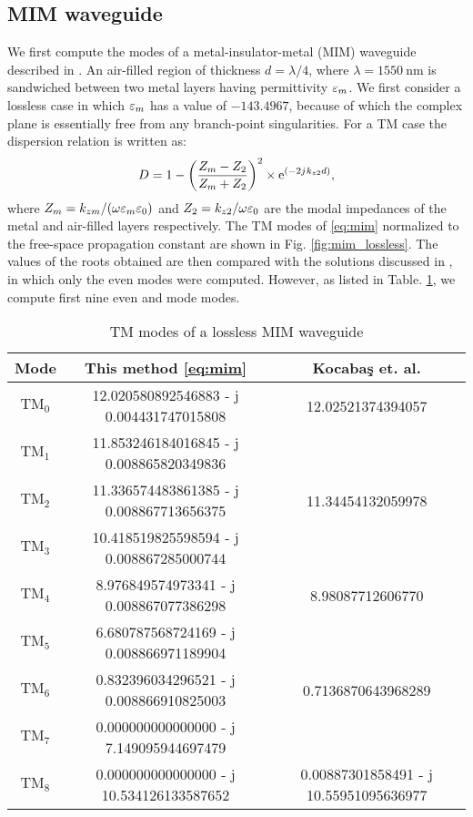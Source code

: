 \documentclass[12pt]{article}
\begin{document}
\subsection{MIM waveguide}
%
%
We first compute the modes of a metal-insulator-metal (MIM) waveguide described in \cite{Kocabas2009}. An air-filled region of thickness $d = \lambda/4$, where $\lambda = \SI{1550}{\nm}$ is sandwiched between two metal layers having permittivity $\varepsilon_m$. We first consider a lossless case in which $\varepsilon_m$ has a value of $-143.4967$, because of which the complex plane is essentially free from any branch-point singularities. For a TM case the dispersion relation is written as:
%
\begin{equation}
  D =  1 - \left(\frac{Z_m - Z_2}{Z_m + Z_2}\right)^2 \times \mathrm{e}^{(-2j\mkern1mu  k_{z2} d)},
  \label{eq:mim}
\end{equation}
%
where $Z_m = k_{zm}/(\omega \varepsilon_m \varepsilon_0)$ and $Z_2 = k_{z2}/{\omega \varepsilon_0}$ are the modal impedances of the metal and air-filled layers respectively. The TM modes of \eqref{eq:mim} normalized to the free-space propagation constant are shown in Fig. \ref{fig:mim_lossless}. The values of the roots obtained are then compared with the solutions discussed in \cite{Kocabas2009}, in which only the even modes were computed. However, as listed in Table. \ref{tab:kocabas_lossless}, we compute first nine even and mode modes.
%
\begin{table}[h!]
\begin{center}
 \begin{tabular}{||c |c |c||}
 \hline
 Mode & This method \eqref{eq:mim} & Kocaba{\c{s}} et. al. \cite{Kocabas2009} \\ [0.5ex]
 \hline\hline
 $\text{TM}_0$ & \num{12.020580892546883 - j 0.004431747015808} & \num{12.02521374394057} \\
 $\text{TM}_1$ & \num{11.853246184016845 - j 0.008865820349836} & \num{} \\
 $\text{TM}_2$ & \num{11.336574483861385 - j 0.008867713656375} & \num{11.34454132059978} \\
 $\text{TM}_3$ & \num{10.418519825598594 - j 0.008867285000744} & \num{} \\
 $\text{TM}_4$ & \num{8.976849574973341 - j 0.008867077386298} & \num{8.98087712606770} \\
 $\text{TM}_5$ & \num{6.680787568724169 - j 0.008866971189904} & \num{} \\
 $\text{TM}_6$ & \num{0.832396034296521 - j 0.008866910825003} & \num{0.7136870643968289} \\
 $\text{TM}_7$ & \num{0.000000000000000 - j 7.149095944697479} & \num{} \\
 $\text{TM}_8$ & \num{0.000000000000000 - j 10.534126133587652} & \num{0.00887301858491 - j 10.55951095636977} \\
 \hline
 \end{tabular}
  \end{center}
 \caption{TM modes of a lossless MIM waveguide}
 \label{tab:kocabas_lossless}
\end{table}
%
\end{document}
